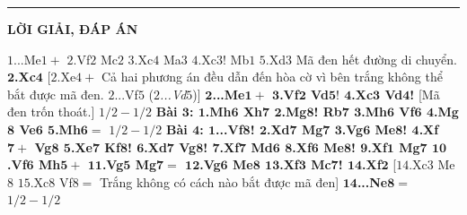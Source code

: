 \vspace*{-10pt}
\rule{1\linewidth}{0.1pt}
\begin{center}
	\vspace*{-5pt}
	\textbf{\Large\color{hoccungpi}LỜI GIẢI, ĐÁP ÁN}
	\vspace*{-5pt}
\end{center}
\begin{multicols}{2}
	$1$...Me$1+$ $2$.Vf$2$ Mc$2$ $3$.Xc$4$ Ma$3$ $4$.Xc$3$! Mb$1$ $5$.Xd$3$ Mã đen hết đường di chuyển.
	\vskip 0.05cm
	\textbf{\color{gocco}$\pmb{2}$.Xc$\pmb{4}$} [$2$.Xe$4+$ Cả hai phương án đều dẫn đến hòa cờ vì bên trắng không thể bắt được mã đen. $2$...Vf$5$ (\textit{$2$...Vd$5$})]
	\vskip 0.05cm
	\textbf{\color{gocco}$\pmb{2}$...Me$\pmb{1+}$ $\pmb{3}$.Vf$\pmb{2}$ Vd$\pmb{5!}$ $\pmb{4}$.Xc$\pmb{3}$ Vd$\pmb{4}$!} [Mã đen trốn thoát.]
	\vskip 0.05cm
	$1/2 -1/2$
	\vskip 0.05cm	
	\textbf{\color{gocco}Bài $\pmb{3}$: $\pmb{1}$.Mh$\pmb{6}$ Xh$\pmb{7}$ $\pmb{2}$.Mg$\pmb{8}$! Rb$\pmb{7}$ $\pmb{3}$.Mh$\pmb{6}$ Vf$\pmb{6}$ $\pmb{4}$.Mg$\pmb{8}$ Ve$\pmb{6}$ $\pmb{5}$.Mh$\pmb{6=}$}
	\vskip 0.05cm
	$1/2 -1/2$
	\vskip 0.05cm
	\textbf{\color{gocco}Bài $\pmb{4}$: $\pmb{1}$...Vf$\pmb{8}$! $\pmb{2}$.Xd$\pmb{7}$ Mg$\pmb{7}$ $\pmb{3}$.Vg$\pmb{6}$ Me$\pmb{8}$! $\pmb{4}$.Xf$\pmb{7+}$ Vg$\pmb{8}$ $\pmb{5}$.Xe$\pmb{7}$ Kf$\pmb{8}$! $\pmb{6}$.Xd$\pmb{7}$ Vg$\pmb{8}$! $\pmb{7}$.Xf$\pmb{7}$ Md$\pmb{6}$ $\pmb{8}$.Xf$\pmb{6}$ Me$\pmb{8}$! $\pmb{9}$.Xf$\pmb{1}$ Mg$\pmb{7}$ $\pmb{10}$.Vf$\pmb{6}$ Mh$\pmb{5+}$ $\pmb{11}$.Vg$\pmb{5}$ Mg$\pmb{7=}$ $\pmb{12}$.Vg$\pmb{6}$ Me$\pmb{8}$ $\pmb{13}$.Xf$\pmb{3}$ Mc$\pmb{7}$! $\pmb{14}$.Xf$\pmb{2}$} [$14$.Xc$3$ Me$8$ $15$.Xc$8$ Vf$8=$ Trắng không có cách nào bắt được mã đen]
	\vskip 0.05cm
	\textbf{\color{gocco}$\pmb{14}$...Ne$\pmb{8=}$} 
	\vskip 0.05cm
	$1/2 -1/2$
\end{multicols}